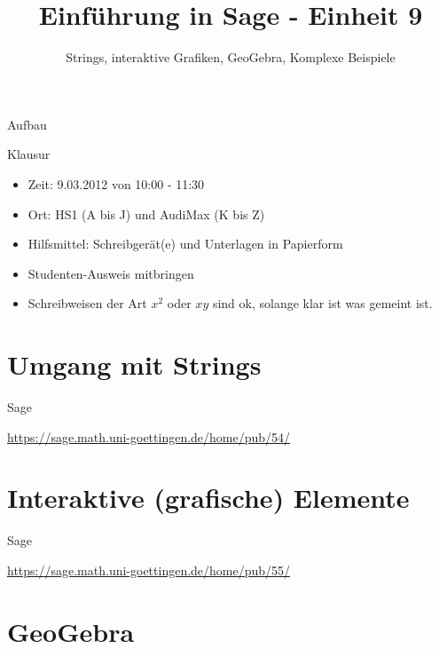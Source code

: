 \documentclass[notes=hide,hyperref={dvipdfmx,pdfpagelabels=false}]{beamer}
\title{Einführung in Sage - Einheit 9}
\subtitle{Strings, interaktive Grafiken, GeoGebra, Komplexe Beispiele}
\begin{document}
\maketitle

\begin{frame}{Aufbau}
\tableofcontents
\end{frame}

\begin{frame}{Klausur}
 \begin{itemize}
\item Zeit: 9.03.2012 von 10:00 - 11:30
\item  Ort: HS1 (A bis J) und AudiMax (K bis Z)
\item  Hilfsmittel: Schreibgerät(e) und Unterlagen in Papierform
\item  Studenten-Ausweis mitbringen
\item Schreibweisen der Art $x^2$ oder $xy$ sind ok, solange klar ist was gemeint ist.
\end{itemize}

\end{frame}

\section{Umgang mit Strings}


\begin{frame}{Sage}
    \begin{center}
        \url{https://sage.math.uni-goettingen.de/home/pub/54/}
    \end{center}
\end{frame}

\section{Interaktive (grafische) Elemente}

\begin{frame}{Sage}
    \begin{center}
        \url{https://sage.math.uni-goettingen.de/home/pub/55/}
    \end{center}
\end{frame}


\section{GeoGebra}
\end{document}
